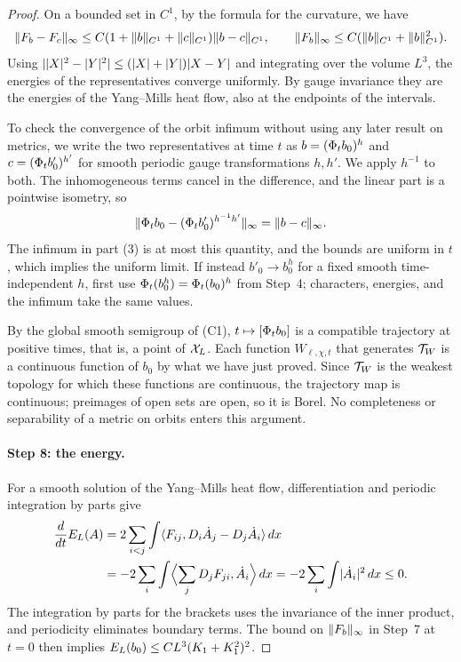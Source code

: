 \begin{proof}
On a bounded set in $C^1$, by the formula for the curvature, we have
\[
 \lVert F_b-F_c\rVert_\infty\le C(1+\lVert b\rVert_{C^1}+\lVert c\rVert_{C^1})\lVert b-c\rVert_{C^1},\qquad
 \lVert F_b\rVert_\infty\le C(\lVert b\rVert_{C^1}+\lVert b\rVert_{C^1}^2).
\]
Using $\lvert \lvert X\rvert^2-\lvert Y\rvert^2\rvert\le(\lvert X\rvert+\lvert Y\rvert)\lvert X-Y\rvert$ and integrating over the volume $L^3$, the energies of the representatives converge uniformly. By gauge invariance they are the energies of the Yang--Mills heat flow, also at the endpoints of the intervals.

To check the convergence of the orbit infimum without using any later result on metrics, we write the two representatives at time $t$ as $b=(\Phi_tb_0)^h$ and $c=(\Phi_tb'_0)^{h'}$ for smooth periodic gauge transformations $h,h'$. We apply $h^{-1}$ to both. The inhomogeneous terms cancel in the difference, and the linear part is a pointwise isometry, so
\[
 \lVert \Phi_tb_0-(\Phi_tb'_0)^{h^{-1}h'}\rVert_\infty=\lVert b-c\rVert_\infty .
\]
The infimum in part (3) is at most this quantity, and the bounds are uniform in $t$, which implies the uniform limit. If instead $b'_0\to b_0^h$ for a fixed smooth time-independent $h$, first use $\Phi_t(b_0^h)=\Phi_t(b_0)^h$ from Step~4; characters, energies, and the infimum take the same values.

By the global smooth semigroup of (C1), $t\mapsto[\Phi_tb_0]$ is a compatible trajectory at positive times, that is, a point of $\mathcal X_L$. Each function $W_{\ell,\chi,t}$ that generates $\mathcal T_W$ is a continuous function of $b_0$ by what we have just proved. Since $\mathcal T_W$ is the weakest topology for which these functions are continuous, the trajectory map is continuous; preimages of open sets are open, so it is Borel. No completeness or separability of a metric on orbits enters this argument.

\paragraph{Step 8: the energy.}
For a smooth solution of the Yang--Mills heat flow, differentiation and periodic integration by parts give
\[
 \begin{split}
 \frac{d}{dt}E_L(A)&=2\sum_{i<j}\int\langle F_{ij},D_i\dot A_j-D_j\dot A_i\rangle\,dx\\
 &=-2\sum_i\int\Bigl\langle\sum_jD_jF_{ji},\dot A_i\Bigr\rangle\,dx=-2\sum_i\int\lvert \dot A_i\rvert^2\,dx\le0 .
 \end{split}
\]
The integration by parts for the brackets uses the invariance of the inner product, and periodicity eliminates boundary terms. The bound on $\lVert F_b\rVert_\infty$ in Step~7 at $t=0$ then implies $E_L(b_0)\le CL^3(K_1+K_1^2)^2$.


\end{proof}
